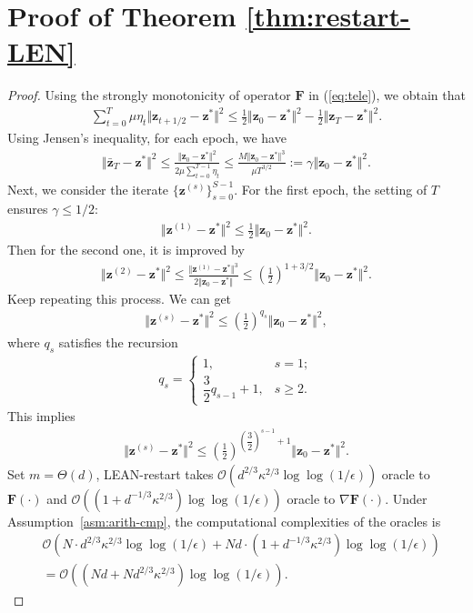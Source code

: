 \documentclass{article}
\def\vz{{\bm{z}}}
\def\mF{{\bm{F}}}
\def\gO{{\mathcal{O}}}
\theoremstyle{plain}
\begin{document}
\section{Proof of Theorem \ref{thm:restart-LEN}}

\begin{proof}
Using the strongly monotonicity of operator $\mF$ in (\ref{eq:tele}), we obtain that 
\begin{align*}
    \sum_{t=0}^T \mu \eta_t \Vert \vz_{t+1/2 } - \vz^* \Vert^2 \le \frac{1}{2} \Vert \vz_0 - \vz^* \Vert^2 - \frac{1}{2} \Vert \vz_{T} - \vz^* \Vert^2. 
\end{align*}
Using Jensen's inequality, for each epoch, we have
\begin{align*}
    \Vert \bar \vz_T - \vz^* \Vert^2 \le \frac{\Vert \vz_0 - \vz^* \Vert^2}{2 \mu \sum_{t=0}^{T-1} \eta_t} \le \frac{M \Vert \vz_0 - \vz^* \Vert^3}{\mu T^{3/2}} := \gamma \Vert \vz_0 - \vz^* \Vert^2.
\end{align*}
Next, we consider the iterate $ \{\vz^{(s)} \}_{s=0}^{S-1}$. For the first epoch,
the setting of $T$ ensures $\gamma \le 1/2$:
\begin{align*}
    \Vert \vz^{(1)} - \vz^* \Vert^2 \le \frac{1}{2} \Vert \vz_0 - \vz^* \Vert^2.
\end{align*}
Then for the second one, it is improved by
\begin{align*}
    \Vert \vz^{(2)} - \vz^* \Vert^2 \le \frac{\Vert \vz^{(1)} - \vz^* \Vert^3}{2 \Vert \vz_0 - \vz^* \Vert} \le \left( \frac{1}{2} \right)^{1 + 3/2} \Vert \vz_0 - \vz^* \Vert^2.
\end{align*}
Keep repeating this process. We can get
\begin{align*}
    \Vert \vz^{(s)} - \vz^* \Vert^2 \le  \left( \frac{1}{2} \right)^{q_s} \Vert \vz_0 - \vz^* \Vert^2,
\end{align*}
where $q_s$ satisfies the recursion
\begin{align*}
    q_{s} = 
    \begin{cases}
        1, & s = 1; \\
        \dfrac{3}{2}q_{s-1} +1, & s \ge 2.
    \end{cases}
\end{align*}
This implies
\begin{align*}
    \Vert \vz^{(s)} - \vz^* \Vert^2 \le \left( \frac{1}{2}\right)^{\left(\dfrac{3}{2}\right)^{s-1}+1} \Vert \vz_0 - \vz^* \Vert^2.
\end{align*}
Set $m=\Theta(d)$, LEAN-restart takes $\gO(d^{2/3}\kappa^{2/3}\log\log(1/\epsilon))$ oracle to $\mF(\cdot)$ and $\gO((1+d^{-1/3}\kappa^{2/3})\log\log(1/\epsilon))$ oracle to $\nabla \mF(\cdot)$. 
Under Assumption~\ref{asm:arith-cmp}, the computational complexities of the oracles is
\begin{align*}
    &\gO\left(N\cdot d^{2/3}\kappa^{2/3}\log\log(1/\epsilon) + Nd\cdot(1+d^{-1/3}\kappa^{2/3})\log\log(1/\epsilon)\right) \\
    &=\gO\left((Nd+Nd^{2/3}\kappa^{2/3})\log\log(1/\epsilon)\right).
\end{align*}

\end{proof}
\end{document}
